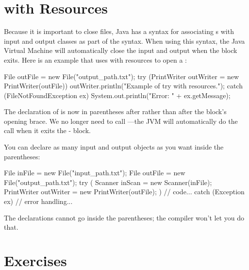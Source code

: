 \section{ with Resources}

Because it is important to close files, Java has a syntax for associating s with input and output classes as part of the  syntax. When using this syntax, the Java Virtual Machine will automatically close the input and output when the  block exits. Here is an example that uses  with resources to open  a :

\begin{code}
File outFile = new File("output_path.txt");
try (PrintWriter outWriter = new PrintWriter(outFile)) {
    outWriter.println("Example of try with resources.");
}
catch (FileNotFoundException ex) {
    System.out.println("Error: " + ex.getMessage);
}
\end{code}

The declaration of  is now in parentheses after  rather than after the block's opening brace.
We no longer need to call ---the JVM will automatically do the call when it exits the - block.

You can declare as many input and output objects as you want inside the parentheses:

\begin{code}
File inFile = new File("input_path.txt");
File outFile = new File("output_path.txt");
try (
    Scanner inScan = new Scanner(inFile);
    PrintWriter outWriter = new PrintWriter(outFile);
) {
    // code...
}
catch (Exception ex) {
    // error handling...
}
\end{code}

The  declarations cannot go inside the parentheses; the compiler won't let you do that.

\section{Exercises}

